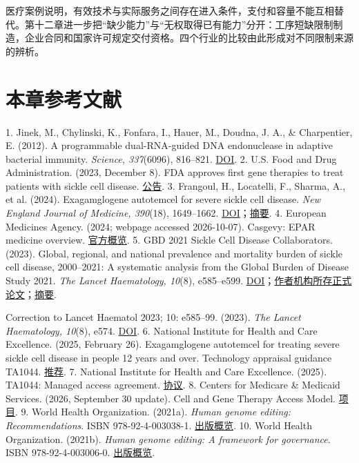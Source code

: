 \documentclass[UTF8,fontset=windows,12pt,a4paper,oneside,openany]{ctexbook}
\begin{document}
医疗案例说明，有效技术与实际服务之间存在进入条件，支付和容量不能互相替代。第十二章进一步把“缺少能力”与“无权取得已有能力”分开：工序短缺限制制造，企业合同和国家许可规定交付资格。四个行业的比较由此形成对不同限制来源的辨析。

\section*{本章参考文献}

1. Jinek, M., Chylinski, K., Fonfara, I., Hauer, M., Doudna, J. A., \& Charpentier, E. (2012). A programmable dual-RNA-guided DNA endonuclease in adaptive bacterial immunity. \emph{Science, 337}(6096), 816–821. \href{https://doi.org/10.1126/science.1225829}{DOI}.
2. U.S. Food and Drug Administration. (2023, December 8). FDA approves first gene therapies to treat patients with sickle cell disease. \href{https://www.fda.gov/news-events/press-announcements/fda-approves-first-gene-therapies-treat-patients-sickle-cell-disease}{公告}.
3. Frangoul, H., Locatelli, F., Sharma, A., et al. (2024). Exagamglogene autotemcel for severe sickle cell disease. \emph{New England Journal of Medicine, 390}(18), 1649–1662. \href{https://doi.org/10.1056/NEJMoa2309676}{DOI}；\href{https://pubmed.ncbi.nlm.nih.gov/38661449/}{摘要}.
4. European Medicines Agency. (2024; webpage accessed 2026-10-07). Casgevy: EPAR medicine overview. \href{https://www.ema.europa.eu/en/medicines/human/EPAR/casgevy}{官方概览}.
5. GBD 2021 Sickle Cell Disease Collaborators. (2023). Global, regional, and national prevalence and mortality burden of sickle cell disease, 2000–2021: A systematic analysis from the Global Burden of Disease Study 2021. \emph{The Lancet Haematology, 10}(8), e585–e599. \href{https://doi.org/10.1016/S2352-3026(23)00118-7}{DOI}；\href{https://repository.up.ac.za/server/api/core/bitstreams/fd57c857-9ec2-4897-b38c-ff955abb4bb0/content}{作者机构所存正式论文}；\href{https://pubmed.ncbi.nlm.nih.gov/37331373/}{摘要}.

Correction to Lancet Haematol 2023; 10: e585–99. (2023). \emph{The Lancet Haematology, 10}(8), e574. \href{https://doi.org/10.1016/S2352-3026(23)00215-6}{DOI}.
6. National Institute for Health and Care Excellence. (2025, February 26). Exagamglogene autotemcel for treating severe sickle cell disease in people 12 years and over. Technology appraisal guidance TA1044. \href{https://www.nice.org.uk/guidance/ta1044/chapter/1-recommendations}{推荐}.
7. National Institute for Health and Care Excellence. (2025). TA1044: Managed access agreement. \href{https://www.nice.org.uk/guidance/ta1044/resources/managed-access-agreement-pdf-15250968973}{协议}.
8. Centers for Medicare \& Medicaid Services. (2026, September 30 update). Cell and Gene Therapy Access Model. \href{https://www.cms.gov/priorities/innovation/innovation-models/cgt}{项目}.
9. World Health Organization. (2021a). \emph{Human genome editing: Recommendations}. ISBN 978-92-4-003038-1. \href{https://www.who.int/publications/i/item/9789240030381}{出版概览}.
10. World Health Organization. (2021b). \emph{Human genome editing: A framework for governance}. ISBN 978-92-4-003006-0. \href{https://www.who.int/publications/i/item/9789240030060}{出版概览}.
\end{document}
